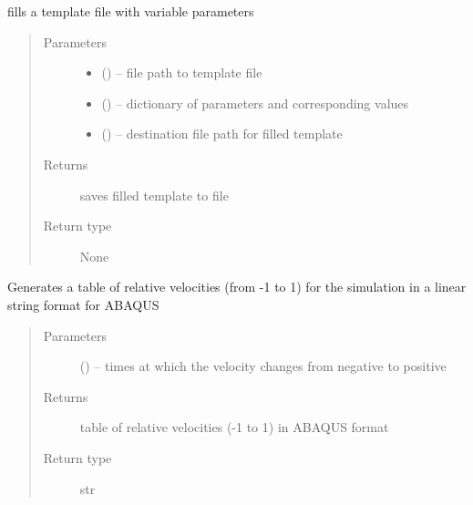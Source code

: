 \documentclass[letterpaper,10pt,english]{sphinxmanual}
\begin{document}

\begin{fulllineitems}
\label{\detokenize{MouseReferenceManual:Modules.Module_OSTRICH.fillTemplate}}
fills a template file with variable parameters
\begin{quote}\begin{description}
\item[{Parameters}] \leavevmode\begin{itemize}
\item {} 
 () -- file path to template file

\item {} 
 () -- dictionary of parameters and corresponding values

\item {} 
 () -- destination file path for filled template

\end{itemize}

\item[{Returns}] \leavevmode
saves filled template to file

\item[{Return type}] \leavevmode
None

\end{description}\end{quote}

\end{fulllineitems}


\begin{fulllineitems}
\label{\detokenize{MouseReferenceManual:Modules.Module_OSTRICH.getVelocityString}}
Generates a table of relative velocities (from -1 to 1) for the simulation in a linear string format for ABAQUS
\begin{quote}\begin{description}
\item[{Parameters}] \leavevmode
{} () -- times at which the velocity changes from negative to positive

\item[{Returns}] \leavevmode
table of relative velocities (-1 to 1) in ABAQUS format

\item[{Return type}] \leavevmode
str

\end{description}\end{quote}

\end{fulllineitems}
\end{document}
